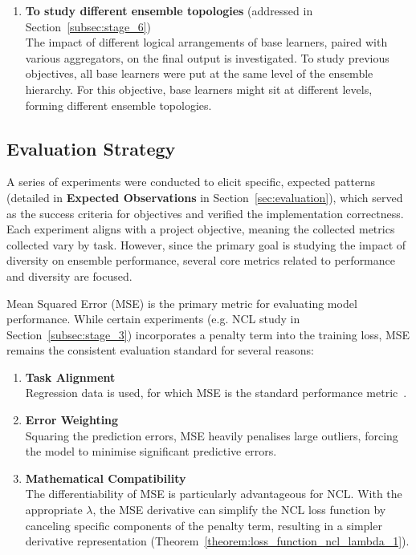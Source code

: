 \begin{enumerate}
    \item \textbf{To study different ensemble topologies} (addressed in Section~\ref{subsec:stage_6}) \\
    The impact of different logical arrangements of base learners, paired with various aggregators, on the final output is investigated. To study previous objectives, all base learners were put at the same level of the ensemble hierarchy. For this objective, base learners might sit at different levels, forming different ensemble topologies. 
\end{enumerate}




\subsection{Evaluation Strategy}
A series of experiments were conducted to elicit specific, expected patterns (detailed in \textbf{Expected Observations} in Section~\ref{sec:evaluation}), which served as the success criteria for objectives and verified the implementation correctness. Each experiment aligns with a project objective, meaning the collected metrics collected vary by task. However, since the primary goal is studying the impact of diversity on ensemble performance, several core metrics related to performance and diversity are focused. 

Mean Squared Error (MSE) is the primary metric for evaluating model performance. While certain experiments (e.g. NCL study in Section~\ref{subsec:stage_3}) incorporates a penalty term into the training loss, MSE remains the consistent evaluation standard for several reasons: 

\begin{enumerate}
    \item \textbf{Task Alignment} \\
    Regression data is used, for which MSE is the standard performance metric~\cite{hodson2021mean}. 

    \item \textbf{Error Weighting} \\
    Squaring the prediction errors, MSE heavily penalises large outliers, forcing the model to minimise significant predictive errors. 

    \item \textbf{Mathematical Compatibility} \\
    The differentiability of MSE is particularly advantageous for NCL. With the appropriate $\lambda$, the MSE derivative can simplify the NCL loss function by canceling specific components of the penalty term, resulting in a simpler derivative representation (Theorem~\ref{theorem:loss_function_ncl_lambda_1}). 
\end{enumerate}

